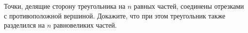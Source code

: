 \begin{ex}
	\begin{condition}
		Точки, делящие сторону треугольника на \( n  \) равных частей, соединены отрезками с противоположной вершиной. Докажите, что при этом треугольник также разделился на \( n  \) равновеликих частей.
	\end{condition}
\end{ex}